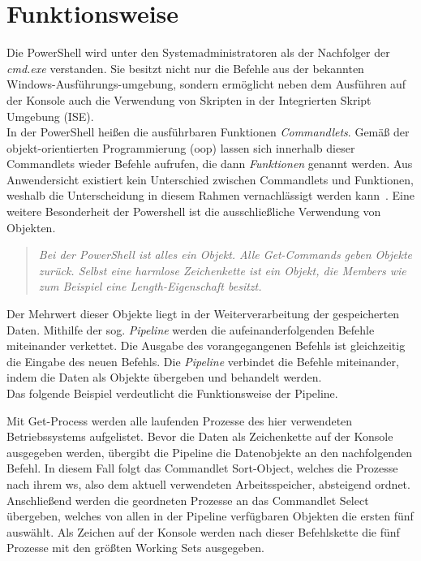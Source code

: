 \section{Funktionsweise}
Die PowerShell wird unter den Systemadministratoren als der Nachfolger der \textit{cmd.exe} verstanden. Sie besitzt nicht nur die Befehle aus der bekannten Windows-Ausführungs-umgebung, sondern ermöglicht neben dem Ausführen auf der Konsole auch die Verwendung von Skripten in der Integrierten Skript Umgebung (ISE).~\cite[S.~7]{Schauland2016}\medskip\\
In der PowerShell heißen die ausführbaren Funktionen \textit{Commandlets}. Gemäß der objekt-orientierten Programmierung (\acrshort{oop}) lassen sich innerhalb dieser Commandlets wieder Befehle aufrufen, die dann \textit{Funktionen} genannt werden. Aus Anwendersicht existiert kein Unterschied zwischen Commandlets und Funktionen, weshalb die Unterscheidung in diesem Rahmen vernachlässigt werden kann~\cite[S.~34]{HolgerSchwichtenberg2018}.
Eine weitere Besonderheit der Powershell ist die ausschließliche Verwendung von Objekten.
\begin{quote}\textit{\glqq Bei der PowerShell ist alles ein Objekt. Alle Get-Commands geben Objekte zur{\"u}ck. Selbst eine harmlose Zeichenkette ist ein Objekt, die Members wie zum Beispiel eine \textit{Length-­}Eigenschaft besitzt.\grqq{}}~\cite[S.~15]{Monadjemi2017}\end{quote}
Der Mehrwert dieser Objekte liegt in der Weiterverarbeitung der gespeicherten Daten. Mithilfe der sog. \textit{Pipeline} werden die aufeinanderfolgenden Befehle miteinander verkettet. Die Ausgabe des vorangegangenen Befehls ist gleichzeitig die Eingabe des neuen Befehls. Die \textit{Pipeline} verbindet die Befehle miteinander, indem die Daten als Objekte übergeben und behandelt werden.\medskip\\Das folgende Beispiel verdeutlicht die Funktionsweise der Pipeline.

Mit Get-Process werden alle laufenden Prozesse des hier verwendeten Betriebssystems aufgelistet. Bevor die Daten als Zeichenkette auf der Konsole ausgegeben werden, übergibt die Pipeline die Datenobjekte an den nachfolgenden Befehl. In diesem Fall folgt das Commandlet Sort-Object, welches die Prozesse nach ihrem \acrfull{ws}, also dem aktuell verwendeten Arbeitsspeicher, absteigend ordnet. Anschließend werden die geordneten Prozesse an das Commandlet Select übergeben, welches von allen in der Pipeline verfügbaren Objekten die ersten fünf auswählt. Als Zeichen auf der Konsole werden nach dieser Befehlskette die fünf Prozesse mit den größten Working Sets ausgegeben.
